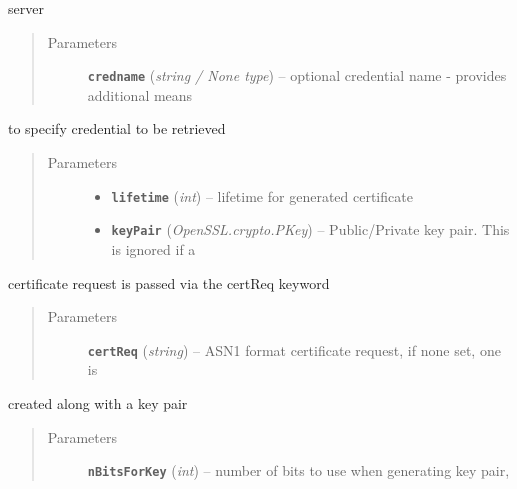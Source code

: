 \documentclass[letterpaper,10pt,english]{sphinxmanual}
\begin{document}
\begin{fulllineitems}
\begin{fulllineitems}
\begin{quote}
\begin{description}
\begin{itemize}
\end{itemize}

\end{description}\end{quote}

server
\begin{quote}\begin{description}
\item[{Parameters}] \leavevmode
\textbf{\texttt{credname}} (\emph{string / None type}) -- optional credential name - provides additional means

\end{description}\end{quote}

to specify credential to be retrieved
\begin{quote}\begin{description}
\item[{Parameters}] \leavevmode\begin{itemize}
\item {} 
\textbf{\texttt{lifetime}} (\emph{int}) -- lifetime for generated certificate

\item {} 
\textbf{\texttt{keyPair}} (\emph{OpenSSL.crypto.PKey}) -- Public/Private key pair.  This is ignored if a

\end{itemize}

\end{description}\end{quote}

certificate request is passed via the certReq keyword
\begin{quote}\begin{description}
\item[{Parameters}] \leavevmode
\textbf{\texttt{certReq}} (\emph{string}) -- ASN1 format certificate request, if none set, one is

\end{description}\end{quote}

created along with a key pair
\begin{quote}\begin{description}
\item[{Parameters}] \leavevmode
\textbf{\texttt{nBitsForKey}} (\emph{int}) -- number of bits to use when generating key pair,

\end{description}\end{quote}


\end{fulllineitems}
\end{fulllineitems}
\end{document}
